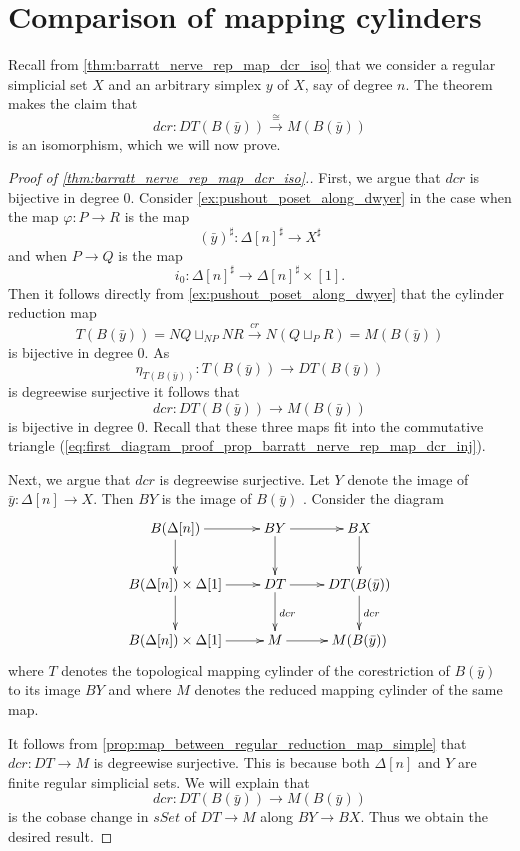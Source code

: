 

\section{Comparison of mapping cylinders}
\label{sec:comparison}


Recall from \cref{thm:barratt_nerve_rep_map_dcr_iso} that we consider a regular simplicial set $X$ and an arbitrary simplex $y$ of $X$, say of degree $n$. The theorem makes the claim that
\[dcr:DT(B(\bar{y} ))\xrightarrow{\cong } M(B(\bar{y} ))\]
is an isomorphism, which we will now prove.
\begin{proof}[Proof of \cref{thm:barratt_nerve_rep_map_dcr_iso}.]
First, we argue that $dcr$ is bijective in degree $0$. Consider \cref{ex:pushout_poset_along_dwyer} in the case when the map $\varphi :P\to R$ is the map
\[(\bar{y} )^\sharp :\Delta [n]^\sharp \to X^\sharp\]
and when $P\to Q$ is the map
\[i_0:\Delta [n]^\sharp \to \Delta [n]^\sharp \times [1].\]
Then it follows directly from \cref{ex:pushout_poset_along_dwyer} that the cylinder reduction map
\[T(B(\bar{y} ))=NQ\sqcup _{NP}NR\xrightarrow{cr} N(Q\sqcup _PR)=M(B(\bar{y} ))\]
is bijective in degree $0$. As
\[\eta _{T(B(\bar{y} ))}:T(B(\bar{y} ))\to DT(B(\bar{y} ))\]
is degreewise surjective it follows that
\[dcr:DT(B(\bar{y} ))\to M(B(\bar{y} ))\]
is bijective in degree $0$. Recall that these three maps fit into the commutative triangle (\ref{eq:first_diagram_proof_prop_barratt_nerve_rep_map_dcr_inj}).

Next, we argue that $dcr$ is degreewise surjective. Let $Y$ denote the image of $\bar{y} :\Delta [n]\to X$. Then $BY$ is the image of $B(\bar{y} )$ \cite[Lem.~2.4.20]{WJR13}. Consider the diagram
\begin{equation}
\label{eq:first_diagram_proof_thm_barratt_nerve_rep_map_dcr_iso}
\begin{gathered}
\xymatrix{
B(\Delta [n]) \ar[d] \ar[r] & BY \ar[d] \ar[r] & BX \ar[d] \\
B(\Delta [n])\times \Delta [1] \ar[d] \ar[r] & DT \ar[d]^{dcr} \ar[r] & DT(B(\bar{y} )) \ar[d]^{dcr} \\
B(\Delta [n])\times \Delta [1] \ar[r] & M \ar[r] & M(B(\bar{y} ))
}
\end{gathered}
\end{equation}
where $T$ denotes the topological mapping cylinder of the corestriction of $B(\bar{y} )$ to its image $BY$ and where $M$ denotes the reduced mapping cylinder of the same map.

It follows from \cref{prop:map_between_regular_reduction_map_simple} that $dcr:DT\to M$ is degreewise surjective. This is because both $\Delta [n]$ and $Y$ are finite regular simplicial sets. We will explain that
\[dcr:DT(B(\bar{y} ))\to M(B(\bar{y} ))\]
is the cobase change in $sSet$ of $DT\to M$ along $BY\to BX$. Thus we obtain the desired result.


\end{proof}
